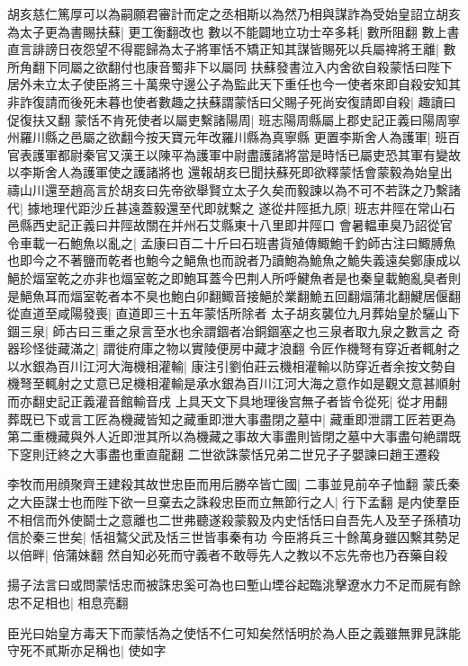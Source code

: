 胡亥慈仁篤厚可以為嗣願君審計而定之丞相斯以為然乃相與謀詐為受始皇詔立胡亥為太子更為書賜扶蘇|{
	更工衡翻改也}
數以不能闢地立功士卒多耗|{
	數所阻翻}
數上書直言誹謗日夜怨望不得罷歸為太子將軍恬不矯正知其謀皆賜死以兵屬禆將王離|{
	數所角翻下同屬之欲翻付也康音蜀非下以屬同}
扶蘇發書泣入内舍欲自殺蒙恬曰陛下居外未立太子使臣將三十萬衆守邊公子為監此天下重任也今一使者來即自殺安知其非詐復請而後死未暮也使者數趣之扶蘇謂蒙恬曰父賜子死尚安復請即自殺|{
	趣讀曰促復扶又翻}
蒙恬不肯死使者以屬吏繫諸陽周|{
	班志陽周縣屬上郡史記正義曰陽周寧州羅川縣之邑屬之欲翻今按天寶元年改羅川縣為真寧縣}
更置李斯舍人為護軍|{
	班百官表護軍都尉秦官又漢王以陳平為護軍中尉盡護諸將當是時恬已屬吏恐其軍有變故以李斯舍人為護軍使之護諸將也}
還報胡亥巳聞扶蘇死即欲釋蒙恬會蒙毅為始皇出禱山川還至趙高言於胡亥曰先帝欲舉賢立太子久矣而毅諫以為不可不若誅之乃繫諸代|{
	據地理代距沙丘甚遠蓋毅還至代即就繫之}
遂從井陘抵九原|{
	班志井陘在常山石邑縣西史記正義曰井陘故關在并州石艾縣東十八里即井陘口}
會暑輼車臭乃詔從官令車載一石鮑魚以亂之|{
	孟康曰百二十斤曰石班書貨殖傳鯫鮑千釣師古注曰鯫膊魚也即今之不著鹽而乾者也鮑今之䱒魚也而說者乃讀鮑為鮠魚之鮠失義遠矣鄭康成以䱒於煏室乾之亦非也煏室乾之即鮑耳蓋今巴荆人所呼鰎魚者是也秦皇載鮑亂臭者則是䱒魚耳而煏室乾者本不臭也鮑白卯翻鯫音接䱒於業翻鮠五回翻煏蒲北翻鰎居偃翻}
從直道至咸陽發喪|{
	直道即三十五年蒙恬所除者}
太子胡亥襲位九月葬始皇於驪山下錮三泉|{
	師古曰三重之泉言至水也余謂錮者冶銅錮塞之也三泉者取九泉之數言之}
奇器珍怪徙藏滿之|{
	謂徙府庫之物以實陵便房中藏才浪翻}
令匠作機弩有穿近者輒射之以水銀為百川江河大海機相灌輸|{
	康注引劉伯莊云機相灌輸以防穿近者余按文勢自機弩至輒射之丈意已足機相灌輸是承水銀為百川江河大海之意作如是觀文意甚順射而亦翻史記正義灌音館輸音戌}
上具天文下具地理後宫無子者皆令從死|{
	從才用翻}
葬既已下或言工匠為機藏皆知之藏重即泄大事盡閉之墓中|{
	藏重即泄謂工匠若更為第二重機藏與外人近即泄其所以為機藏之事故大事盡則皆閉之墓中大事盡句絶謂既下窆則迀終之大事盡也重直龍翻}
二世欲誅蒙恬兄弟二世兄子子嬰諫曰趙王遷殺

李牧而用顔聚齊王建殺其故世忠臣而用后勝卒皆亡國|{
	二事並見前卒子恤翻}
蒙氏秦之大臣謀士也而陛下欲一旦棄去之誅殺忠臣而立無節行之人|{
	行下孟翻}
是内使羣臣不相信而外使鬬士之意離也二世弗聽遂殺蒙毅及内史恬恬曰自吾先人及至子孫積功信於秦三世矣|{
	恬祖鷔父武及恬三世皆事秦有功}
今臣將兵三十餘萬身雖囚繫其勢足以倍畔|{
	倍蒲妹翻}
然自知必死而守義者不敢辱先人之教以不忘先帝也乃吞藥自殺

揚子法言曰或問蒙恬忠而被誅忠奚可為也曰塹山堙谷起臨洮擊遼水力不足而屍有餘忠不足相也|{
	相息亮翻}


臣光曰始皇方毒天下而蒙恬為之使恬不仁可知矣然恬明於為人臣之義雖無罪見誅能守死不貳斯亦足稱也|{
	使如字}


